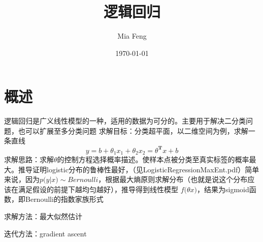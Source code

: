 \documentclass{ctexart}
\title{逻辑回归} %
\author{Mia Feng} %
\date{\today} %
\begin{document}
\maketitle %




\section{概述}
逻辑回归是广义线性模型的一种，适用的数据为可分的。主要用于解决二分类问题，也可以扩展至多分类问题
求解目标：分类超平面，以二维空间为例，求解一条直线
\begin{equation}
y = b+\theta_1x_1+\theta_2x_2=\theta^{\mathbf{T}}x+b
\end{equation}
求解思路：求解$\theta$的控制方程选择概率描述。使样本点被分类至真实标签的概率最大。推导证明logistic分布的鲁棒性最好，（见LogisticRegressionMaxEnt.pdf）简单来说，因为$p\big(y|x\big)\sim Bernoulli$，根据最大熵原则求解分布（也就是说这个分布应该在满足假设的前提下越均匀越好），推导得到线性模型
$f\big( \theta x \big)$，结果为sigmoid函数，即Bernoulli的指数家族形式

求解方法：最大似然估计

迭代方法：gradient ascent


\end{document}
